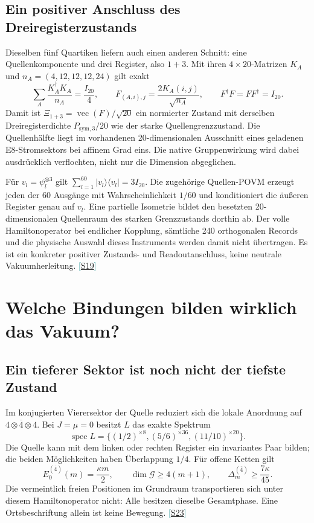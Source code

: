 \documentclass[11pt,a4paper,oneside,parskip=half,headings=normal,numbers=noenddot,bibliography=totoc]{scrreprt}
\newcommand{\spec}{\operatorname{spec}}
\newcommand{\src}[1]{\textcolor{teal}{\small[\hyperref[s:#1]{S#1}]}}
\begin{document}
\section{Ein positiver Anschluss des Dreiregisterzustands}
Dieselben fünf Quartiken liefern auch einen anderen Schnitt: eine Quellenkomponente und drei Register, also $1+3$. Mit ihren $4\times20$-Matrizen $K_A$ und $n_A=(4,12,12,12,24)$ gilt exakt
\[
 \sum_A\frac{K_A^\dagger K_A}{n_A}=\frac{I_{20}}4,
 \qquad F_{(A,i),j}=\frac{2K_A(i,j)}{\sqrt{n_A}},
 \qquad F^\dagger F=FF^\dagger=I_{20}.
\]
Damit ist $\Xi_{1+3}=\operatorname{vec}(F)/\sqrt{20}$ ein normierter Zustand mit derselben Dreiregisterdichte $P_{\mathrm{sym},3}/20$ wie der starke Quellengrenzzustand. Die Quellenhälfte liegt im vorhandenen 20-dimensionalen Ausschnitt eines geladenen E8-Stromsektors bei affinem Grad eins. Die native Gruppenwirkung wird dabei ausdrücklich verflochten, nicht nur die Dimension abgeglichen.

Für $v_l=\psi_l^{\otimes3}$ gilt $\sum_{l=1}^{60}|v_l\rangle\langle v_l|=3I_{20}$. Die zugehörige Quellen-POVM erzeugt jeden der 60 Ausgänge mit Wahrscheinlichkeit $1/60$ und konditioniert die äußeren Register genau auf $v_l$. Eine partielle Isometrie bildet den besetzten 20-dimensionalen Quellenraum des starken Grenzzustands dorthin ab. Der volle Hamiltonoperator bei endlicher Kopplung, sämtliche 240 orthogonalen Records und die physische Auswahl dieses Instruments werden damit nicht übertragen. Es ist ein konkreter positiver Zustands- und Readoutanschluss, keine neutrale Vakuumherleitung. \src{19}

\chapter{Welche Bindungen bilden wirklich das Vakuum?}
\section{Ein tieferer Sektor ist noch nicht der tiefste Zustand}
Im konjugierten Vierersektor der Quelle reduziert sich die lokale Anordnung auf $4\otimes\overline4\otimes4$. Bei $J=\mu=0$ besitzt $L$ das exakte Spektrum
\[
 \spec L=\{(1/2)^{\times8},(5/6)^{\times36},(11/10)^{\times20}\}.
\]
Die Quelle kann mit dem linken oder rechten Register ein invariantes Paar bilden; die beiden Möglichkeiten haben Überlappung $1/4$. Für offene Ketten gilt
\[
 E_0^{(\overline4)}(m)=\frac{\kappa m}2,\qquad
 \dim\mathcal G\ge4(m+1),\qquad
 \Delta_m^{(\overline4)}\ge\frac{7\kappa}{45}.
\]
Die vermeintlich freien Positionen im Grundraum transportieren sich unter diesem Hamiltonoperator nicht: Alle besitzen dieselbe Gesamtphase. Eine Ortsbeschriftung allein ist keine Bewegung. \src{23}
\end{document}
